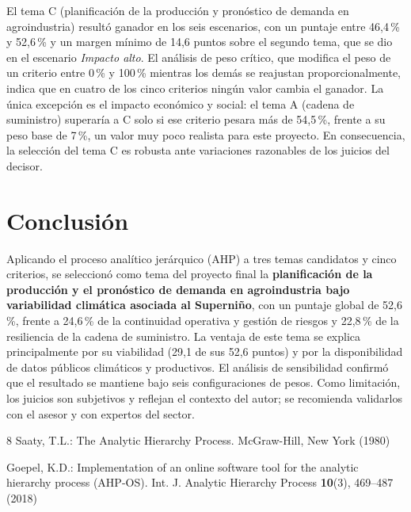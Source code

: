 \documentclass[runningheads]{llncs}
\begin{document}
El tema C (planificación de la producción y pronóstico de demanda en agroindustria) resultó ganador en los seis escenarios, con un puntaje entre 46,4\,\% y 52,6\,\% y un margen mínimo de 14,6 puntos sobre el segundo tema, que se dio en el escenario \emph{Impacto alto}. El análisis de peso crítico, que modifica el peso de un criterio entre 0\,\% y 100\,\% mientras los demás se reajustan proporcionalmente, indica que en cuatro de los cinco criterios ningún valor cambia el ganador. La única excepción es el impacto económico y social: el tema A (cadena de suministro) superaría a C solo si ese criterio pesara más de 54,5\,\%, frente a su peso base de 7\,\%, un valor muy poco realista para este proyecto. En consecuencia, la selección del tema C es robusta ante variaciones razonables de los juicios del decisor.

\section{Conclusión}

Aplicando el proceso analítico jerárquico (AHP) a tres temas candidatos y cinco criterios, se seleccionó como tema del proyecto final la \textbf{planificación de la producción y el pronóstico de demanda en agroindustria bajo variabilidad climática asociada al Superniño}, con un puntaje global de 52,6\,\%, frente a 24,6\,\% de la continuidad operativa y gestión de riesgos y 22,8\,\% de la resiliencia de la cadena de suministro. La ventaja de este tema se explica principalmente por su viabilidad (29,1 de sus 52,6 puntos) y por la disponibilidad de datos públicos climáticos y productivos. El análisis de sensibilidad confirmó que el resultado se mantiene bajo seis configuraciones de pesos. Como limitación, los juicios son subjetivos y reflejan el contexto del autor; se recomienda validarlos con el asesor y con expertos del sector.

\begin{thebibliography}{8}
Saaty, T.L.: The Analytic Hierarchy Process. McGraw-Hill, New York (1980)

Goepel, K.D.: Implementation of an online software tool for the analytic hierarchy process (AHP-OS). Int. J. Analytic Hierarchy Process \textbf{10}(3), 469--487 (2018)
\end{thebibliography}
\end{document}
